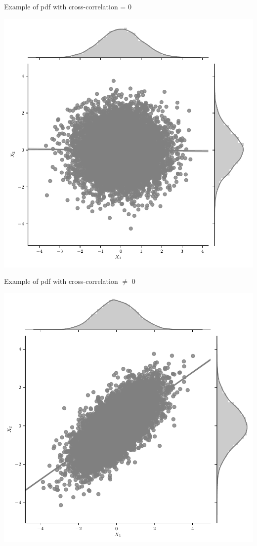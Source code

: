 \documentclass{beamer}
\begin{document}
\begin{frame}{Example of pdf with cross-correlation  = 0}
	\begin{center}
		\includegraphics[width=\linewidth,height=\textheight - 10pt,keepaspectratio]{gp/2d-gp3}
	\end{center}
\end{frame}

\begin{frame}{Example of pdf with cross-correlation  $\neq$ 0}
	\begin{center}
		\includegraphics[width=\linewidth,height=\textheight - 10pt,keepaspectratio]{gp/2d-gp}
	\end{center}
\end{frame}
\end{document}
